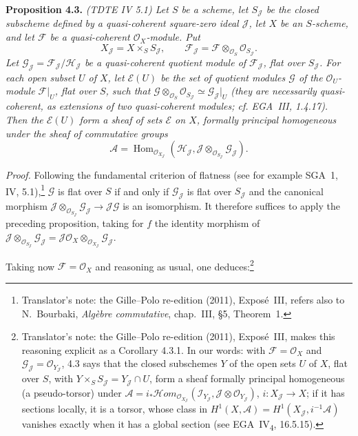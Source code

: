 \medskip
\noindent{}\textbf{Proposition 4.3.} \textit{(TDTE IV 5.1) Let \(S\) be a
scheme, let \(S_{\mathscr J}\) be the closed subscheme defined by a
quasi-coherent square-zero ideal \(\mathscr J\), let \(X\) be an
\(S\)-scheme, and let \(\mathscr F\) be a quasi-coherent
\(\mathscr O_X\)-module. Put
\[
 X_{\mathscr J}=X\times_S S_{\mathscr J},\qquad
 \mathscr F_{\mathscr J}
 =\mathscr F\otimes_{\mathscr O_S}\mathscr O_{S_{\mathscr J}}.
\]
Let
\(\mathscr G_{\mathscr J}=\mathscr F_{\mathscr J}/\mathscr H_{\mathscr J}\)
be a quasi-coherent quotient module of \(\mathscr F_{\mathscr J}\), flat
over \(S_{\mathscr J}\). For each open subset \(U\) of \(X\), let
\(\mathcal E(U)\) be the set of quotient modules
\(\mathscr G\) of the \(\mathscr O_U\)-module \(\mathscr F|_U\),
flat over \(S\), such that
\(\mathscr G\otimes_{\mathscr O_S}\mathscr O_{S_{\mathscr J}}\simeq
\mathscr G_{\mathscr J}|_U\) (they are necessarily quasi-coherent, as
extensions of two quasi-coherent modules; cf. EGA~III, 1.4.17). Then the \(\mathcal E(U)\) form a sheaf of
sets \(\mathcal E\) on \(X\), formally principal homogeneous under the
sheaf of commutative groups
\[
 \mathscr A=
 \operatorname{Hom}_{\mathscr O_{X_{\mathscr J}}}
  \left(
   \mathscr H_{\mathscr J},
   \mathscr J\otimes_{\mathscr O_{S_{\mathscr J}}}
   \mathscr G_{\mathscr J}
  \right).
\]}

\noindent\textit{Proof.}
Following the fundamental criterion of flatness (see for example SGA~1,
IV, 5.1),\footnote{Translator's note: the Gille--Polo re-edition (2011), Exposé~III, refers also to N.~Bourbaki,
\emph{Algèbre commutative}, chap.~III, \S5, Theorem~1.} \(\mathscr G\) is
flat over \(S\) if and only if \(\mathscr G_{\mathscr J}\) is flat over
\(S_{\mathscr J}\) and the canonical morphism
\(\mathscr J\otimes_{\mathscr O_{S_{\mathscr J}}}\mathscr G_{\mathscr J}
\to\mathscr J\mathscr G\) is an isomorphism. It therefore suffices to apply
the preceding proposition, taking for \(f\) the identity morphism of
\(\mathscr J\otimes_{\mathscr O_{S_{\mathscr J}}}\mathscr G_{\mathscr J}
=\mathscr J\mathscr O_X\otimes_{\mathscr O_{X_{\mathscr J}}}
\mathscr G_{\mathscr J}\).

Taking now \(\mathscr F=\mathscr O_X\) and reasoning as usual, one
deduces:\footnote{Translator's note: the Gille--Polo re-edition (2011), Exposé~III, makes this reasoning explicit as a
Corollary 4.3.1. In our words: with \(\mathscr F=\mathscr O_X\) and
\(\mathscr G_{\mathscr J}=\mathscr O_{Y_{\mathscr J}}\), 4.3 says that the closed
subschemes \(Y\) of the open sets \(U\) of \(X\), flat over \(S\), with
\(Y\times_SS_{\mathscr J}=Y_{\mathscr J}\cap U\), form a sheaf formally
principal homogeneous (a pseudo-torsor) under
\(\mathscr A=i_*\mathscr{H}om_{\mathscr O_{X_{\mathscr J}}}
(\mathscr I_{Y_{\mathscr J}},\mathscr J\otimes\mathscr O_{Y_{\mathscr J}})\),
\(i\colon X_{\mathscr J}\to X\); if it has sections locally, it is a torsor,
whose class in \(H^1(X,\mathscr A)=H^1(X_{\mathscr J},
i^{-1}\mathscr A)\) vanishes exactly when it has a global section (see
EGA~IV\textsubscript{4}, 16.5.15).}

